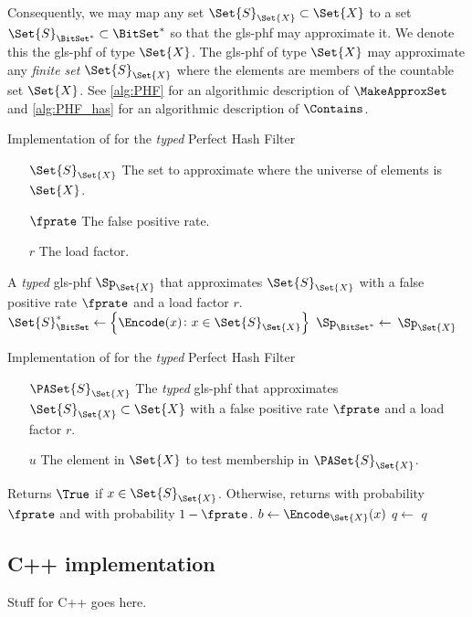 \documentclass[ ../main.tex]{subfiles}
\begin{document}
Consequently, we may map any set $\Set{S}_{\Set{X}} \subset \Set{X}$ to a set $\Set{S}_{\BitSet^{*}} \subset \BitSet^{*}$ so that the \gls{gls-phf} may approximate it.
We denote this the \gls{gls-phf} of type $\Set{X}$.
The \gls{gls-phf} of type $\Set{X}$ may approximate any \emph{finite set} $\Set{S}_{\Set{X}}$ where the elements are members of the countable set $\Set{X}$.
See \cref{alg:PHF} for an algorithmic description of $\MakeApproxSet$ and \cref{alg:PHF_has} for an algorithmic description of $\Contains$.
\begin{algorithm}[h]
    \caption{Implementation of \protect\MakeApproxSet for the \emph{typed} Perfect Hash Filter}
    \label{alg:typedPHF}
    \KwIn
    {
        \begin{itemize}
            \item[$\Set{S}_{\Set{X}}$] The set to approximate where the universe of elements is $\Set{X}$.
            \item[$\fprate$] The false positive rate.
            \item[$r$] The load factor.
        \end{itemize}
    }
    \KwOut
    {
        A \emph{typed} \gls{gls-phf} $\Sp_{\Set{X}}$ that approximates $\Set{S}_{\Set{X}}$ with a false positive rate $\fprate$ and a load factor $r$.
    }
    {
        $\Set{S}_\BitSet^{*} \gets \left\{ \Encode(x) \colon x \in \Set{S}_{\Set{X}}\right\}$\;
        $\Sp_{\BitSet^{*}} \gets$ \;
        \Return $\Sp_{\Set{X}}$\;
    }
\end{algorithm}
\begin{algorithm}[h]
    \caption{Implementation of \protect\Contains for the \emph{typed} Perfect Hash Filter}
    \label{alg:typed_PHF_contains}
    \KwIn
    {
        \begin{itemize}
            \item[$\PASet{S}_{\Set{X}}$] The \emph{typed} \gls{gls-phf} that approximates $\Set{S}_{\Set{X}} \subset \Set{X}$ with a false positive rate $\fprate$ and a load factor $r$.
            \item[$u$] The element in $\Set{X}$ to test membership in $\PASet{S}_{\Set{X}}$.
        \end{itemize}
    }
    \KwOut
    {
        Returns $\True$ if $x \in \Set{S}_{\Set{X}}$. Otherwise, returns \True with probability $\fprate$ and \False with probability $1 - \fprate$.
    }
    {
        $b \gets \Encode_\Set{X}(x)$\;
        $q \gets$ \;
        \Return $q$\;
    }
\end{algorithm}

\subsection{C++ implementation}
Stuff for C++ goes here.
\end{document}
